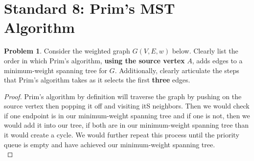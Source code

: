\documentclass[11pt]{article}
\theoremstyle{definition}
\theoremstyle{definition}
\newtheorem{required}{Problem}
\theoremstyle{definition}
\begin{document}
\section{Standard 8: Prim's MST Algorithm}
\begin{required}
Consider the weighted graph $G(V, E, w)$ below. Clearly list the order in which Prim's algorithm, \textbf{using the source vertex} $A$, adds edges to a minimum-weight spanning tree for $G$. Additionally, clearly articulate the steps that Prim's algorithm takes as it selects the first \textbf{three} edges.

\begin{center}
\end{center}
\end{required}

\begin{proof}
Prim's algorithm by definition will traverse the graph by pushing on the source vertex then popping it off and visiting itS neighbors. Then we would check if one endpoint is in our minimum-weight spanning tree and if one is not, then we would add it into our tree, if both are in our minimum-weight spanning tree than it would create a cycle. We would further repeat this process until the priority queue is empty and have achieved our minimum-weight spanning tree. \\


\end{proof}





\newpage
\end{document}

